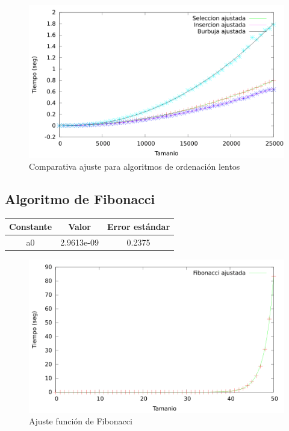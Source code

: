 \documentclass{article}
\begin{document}
	\begin{figure}[h]
		\centering
		\includegraphics[totalheight=8cm]{img/AlgOrdenacionLentos_ajustados}
		\caption{Comparativa ajuste para algoritmos de ordenación lentos}
		\label{fig:AlgOrdenacionLentos_ajustados}
	\end{figure}
	
	
	\subsection{Algoritmo de Fibonacci}
	
	
	\begin{longtable}{|c|c|c|}
		\hline
		Constante		& Valor			& Error estándar	\\ \hline
		a0              & 2.9613e-09	& 0.2375 \\ \hline
	\end{longtable}

	\begin{figure}[h]
		\centering
		\includegraphics[totalheight=8cm]{img/Fibonacci_ajustada}
		\caption{Ajuste función de Fibonacci}
		\label{fig:Fibonacci_ajustada}
	\end{figure}
	
\end{document}

